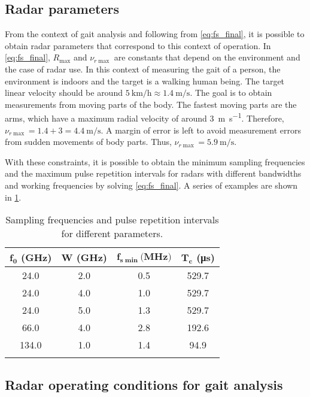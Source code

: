 \subsection{Radar parameters}

From the context of gait analysis and following from \cref{eq:fs_final}, it is possible to obtain radar parameters that correspond to this context of operation. In \cref{eq:fs_final}, $R_{\max}$ and $\nu_{r\max}$ are constants that depend on the environment and the case of radar use. In this context of measuring the gait of a person, the environment is indoors and the target is a walking human being. The target linear velocity should be around $\SI{5}{\kilo\meter\per\hour} \approx \SI{1.4}{\meter\per\second}$. The goal is to obtain measurements from moving parts of the body. The fastest moving parts are the arms, which have a maximum radial velocity of around \SI{3}{\meter\per\second}. Therefore, $\nu_{r\max} = 1.4 + 3 = \SI{4.4}{\meter\per\second}$. A margin of error is left to avoid measurement errors from sudden movements of body parts. Thus, $\nu_{r\max} =\SI{5.9}{\meter\per\second}$.

With these constraints, it is possible to obtain the minimum sampling frequencies and the maximum pulse repetition intervals for radars with different bandwidths and working frequencies by solving \cref{eq:fs_final}. A series of examples are shown in \cref{tab:fs_Tc}.

\begin{longtable}{@{}cccc@{}}
	\toprule
	$\mathbf{f_0}$ \textbf{(GHz)}& $\mathbf{W}$ \textbf{(GHz)} & $\mathbf{f_{s\min}} \textbf{(MHz)}$& $\mathbf{T_c}$ \textbf{(\si{\micro\second})} \\* \midrule
	\endhead
	24.0 & 2.0 & 0.5 & 529.7 \\
	24.0 & 4.0 & 1.0 & 529.7 \\
	24.0 & 5.0 & 1.3 & 529.7 \\
	66.0 & 4.0 & 2.8 & 192.6 \\
	134.0 & 1.0 & 1.4 & 94.9 \\* \bottomrule
	\caption{Sampling frequencies and pulse repetition intervals for different parameters.}
	\label{tab:fs_Tc}
\end{longtable}

\subsection{Radar operating conditions for gait analysis} \label{sec:radar_operating_conditions}

